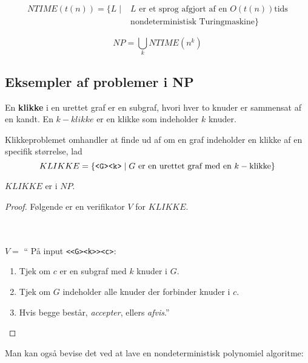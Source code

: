 \begin{definition}
	\begin{align*}
		NTIME(t(n)) = \{ L \mid & L \text{ er et sprog afgjort af en } O(t(n)) \text{tids} \\
		                        & \text{nondeterministisk Turingmaskine}\}
	\end{align*}
\end{definition}


\begin{corollary}
	\begin{equation*}
		NP = \bigcup_{k} NTIME(n^{k})
	\end{equation*}
\end{corollary}


\subsection{Eksempler af problemer i NP}%
\label{subsec:NPexamples}

En \textbf{klikke} i en urettet graf er en subgraf, hvori hver to knuder er sammensat af en kandt. En $k-klikke$ er en klikke som indeholder $k$ knuder.

Klikkeproblemet omhandler at finde ud af om en graf indeholder en klikke af en specifik størrelse, lad
\begin{equation*}
KLIKKE = \{\text{\texttt{<G><k>}} \mid G \text{ er en urettet graf med en } k-\text{klikke}\}
\end{equation*}

\begin{theorem}
$KLIKKE$ er i $NP$.
\end{theorem}

\begin{proof}
  Følgende er en verifikator $V$ for $KLIKKE$.

  \\\\
  \noindent
  $V = $ `` På input \texttt{<<G><k>><c>}:
  \begin{enumerate}
    \item Tjek om $c$ er en subgraf med $k$ knuder i $G$.
    \item Tjek om $G$ indeholder alle knuder der forbinder knuder i $c$.
    \item Hvis begge består, \textit{accepter}, ellers \textit{afvis}.''
  \end{enumerate}
\end{proof}

Man kan også bevise det ved at lave en nondeterministisk polynomiel algoritme:

